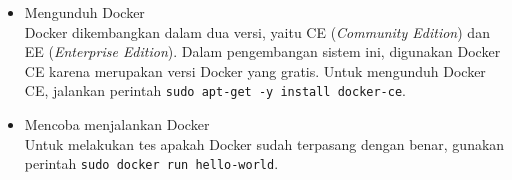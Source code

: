 \begin{itemize}
	\item Mengunduh Docker \\
	Docker dikembangkan dalam dua versi, yaitu CE (\textit{Community Edition}) dan EE (\textit{Enterprise Edition}). Dalam pengembangan sistem ini, digunakan Docker CE karena merupakan versi Docker yang gratis. Untuk mengunduh Docker CE, jalankan perintah \texttt{sudo apt-get -y install docker-ce}.
	
	\item Mencoba menjalankan Docker \\
	Untuk melakukan tes apakah Docker sudah terpasang dengan benar, gunakan perintah \texttt{sudo docker run hello-world}.
\end{itemize}
